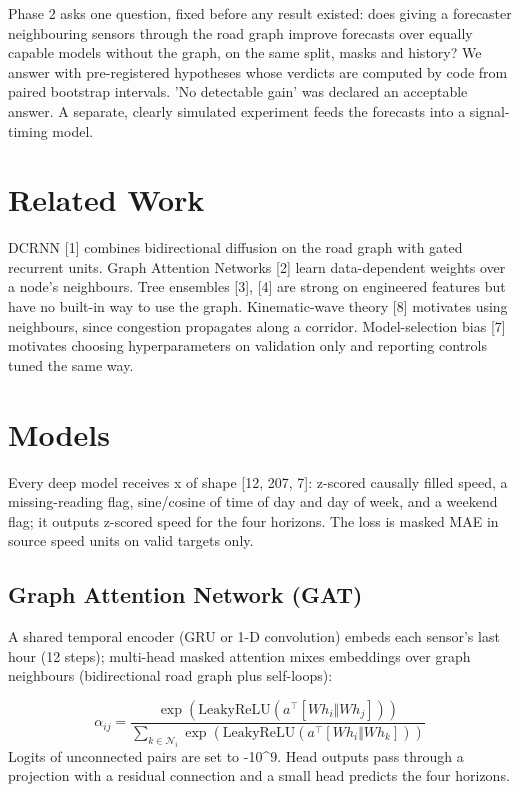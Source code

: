 \documentclass[conference]{IEEEtran}
\begin{document}
Phase 2 asks one question, fixed before any result existed: does giving a forecaster neighbouring sensors through the road graph improve forecasts over equally capable models without the graph, on the same split, masks and history? We answer with pre-registered hypotheses whose verdicts are computed by code from paired bootstrap intervals. 'No detectable gain' was declared an acceptable answer. A separate, clearly simulated experiment feeds the forecasts into a signal-timing model.

\section{Related Work}
DCRNN [1] combines bidirectional diffusion on the road graph with gated recurrent units. Graph Attention Networks [2] learn data-dependent weights over a node's neighbours. Tree ensembles [3], [4] are strong on engineered features but have no built-in way to use the graph. Kinematic-wave theory [8] motivates using neighbours, since congestion propagates along a corridor. Model-selection bias [7] motivates choosing hyperparameters on validation only and reporting controls tuned the same way.

\section{Models}
Every deep model receives x of shape [12, 207, 7]: z-scored causally filled speed, a missing-reading flag, sine/cosine of time of day and day of week, and a weekend flag; it outputs z-scored speed for the four horizons. The loss is masked MAE in source speed units on valid targets only.

\subsection{Graph Attention Network (GAT)}
A shared temporal encoder (GRU or 1-D convolution) embeds each sensor's last hour (12 steps); multi-head masked attention mixes embeddings over graph neighbours (bidirectional road graph plus self-loops):

\begin{equation}\alpha_{ij}=\frac{\exp(\mathrm{LeakyReLU}(a^\top[Wh_i\Vert Wh_j]))}{\sum_{k\in\mathcal{N}_i}\exp(\mathrm{LeakyReLU}(a^\top[Wh_i\Vert Wh_k]))}\end{equation}
Logits of unconnected pairs are set to -10\textasciicircum{}9. Head outputs pass through a projection with a residual connection and a small head predicts the four horizons.
\end{document}
